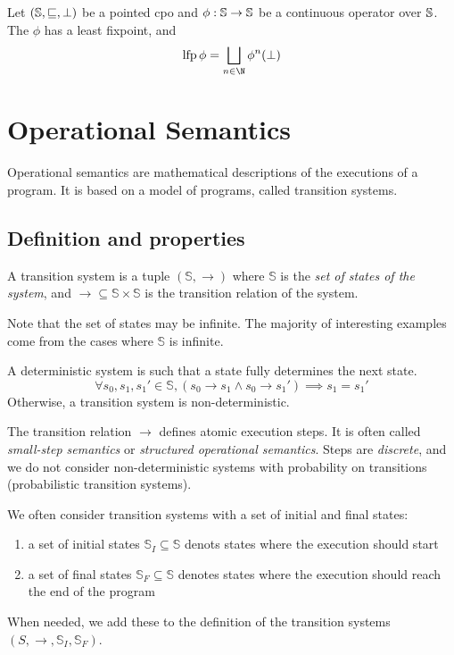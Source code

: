 \documentclass[toc, titlepaged]{../cs-classes/cs-classes}
\DeclareMathOperator{\lfp}{lfp}
\begin{document}
\begin{theorem}[Kleene's]
    Let $(\S, \sqsubseteq, \bot)$ be a pointed cpo and $\phi:\S\to\S$ be a continuous operator over $\S$. The $\phi$ has a least fixpoint, and
    \begin{equation*}
        \lfp\phi = \bigsqcup_{n\in\N}\phi^n(\bot)
    \end{equation*}
\end{theorem}

\renewcommand{\S}{\mathbb{S}}
\newcommand{\B}{\mathbb{B}}

\section{Operational Semantics}
Operational semantics are mathematical descriptions of the executions of a program. It is based on a model of programs, called transition systems.

\subsection{Definition and properties}
\begin{definition}
    A transition system is a tuple $(\S, \to)$ where $\S$ is the \emph{set of states of the system}, and $\to\subseteq\S\times\S$ is the transition relation of the system.
\end{definition}
Note that the set of states may be infinite. The majority of interesting examples come from the cases where $\S$ is infinite.

\begin{definition}
    A deterministic system is such that a state fully determines the next state.
    \begin{equation*}
        \forall s_0, s_1, s_1'\in\S, (s_0\to s_1 \land s_0\to s_1') \implies s_1 = s_1'
    \end{equation*}
    Otherwise, a transition system is non-deterministic.
\end{definition}

The transition relation $\to$ defines atomic execution steps. It is often called \emph{small-step semantics} or \emph{structured operational semantics}. Steps are \emph{discrete}, and we do not consider non-deterministic systems with probability on transitions (probabilistic transition systems).

\begin{definition}
    We often consider transition systems with a set of initial and final states:
    \begin{enumerate}
        \item a set of initial states $\S_I\subseteq\S$ denots states where the execution should start
        \item a set of final states $\S_F\subseteq\S$ denotes states where the execution should reach the end of the program
    \end{enumerate}
    When needed, we add these to the definition of the transition systems $(S, \to, \S_I, \S_F)$.
\end{definition}
\end{document}
